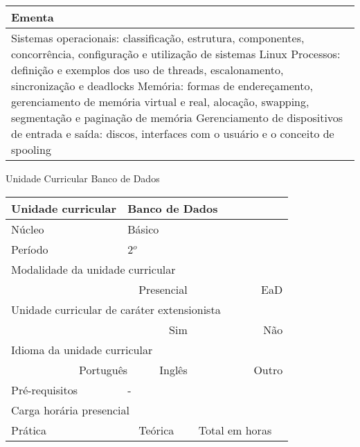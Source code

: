 \begin{quadro}[ht!]
\begin{tabular}{|p{3cm} p{2cm} p{3cm} p{2cm} p{3cm} p{2cm}|}
\multicolumn{6}{|p{15cm}|}{\cellcolor{blue1} Ementa} \\\hline
\hline\multicolumn{6}{|p{15cm}|}{\scriptsize Sistemas operacionais: classificação, estrutura, componentes, concorrência, configuração e utilização de sistemas Linux Processos: definição e exemplos dos uso de threads, escalonamento, sincronização e deadlocks Memória: formas de endereçamento, gerenciamento de memória virtual e real, alocação, swapping, segmentação e paginação de memória Gerenciamento de dispositivos de entrada e saída: discos, interfaces com o usuário e o conceito de spooling}\\\hline
\hline
	\end{tabular}
\end{quadro}
\begin{quadro}[ht!]
  \centering\scriptsize
\caption{Unidade Curricular Banco de Dados}
\label{ unit_9 }
\begin{tabular}{|p{3cm} p{2cm} p{3cm} p{2cm} p{3cm} p{2cm}|}\hline
\multicolumn{1}{|p{3cm}|}{\cellcolor{blue1} Unidade curricular} & \multicolumn{5}{p{9cm}|}{ Banco de Dados }\\\hline
\multicolumn{1}{|p{3cm}|}{\cellcolor{blue1} Núcleo} & \multicolumn{5}{p{11.5cm}|}{ Básico }\\\hline
\multicolumn{1}{|p{3cm}|}{\cellcolor{blue1} Período} & \multicolumn{5}{p{9cm}|}{ 2$^o$ }\\\hline
\multicolumn{6}{|p{15cm}|}{\cellcolor{blue1} Modalidade da unidade curricular} \\\hline
\multicolumn{2}{|r}{		} &  \multicolumn{2}{r}{Presencial \XBox } & \multicolumn{2}{r|}{EaD \Square	} \\\hline
\multicolumn{6}{|p{15cm}|}{\cellcolor{blue1} Unidade curricular de caráter extensionista} \\\hline
\multicolumn{4}{|r}{			Sim \Square	} & \multicolumn{2}{r|}{	Não \XBox	}\\\hline
\multicolumn{6}{|p{15cm}|}{\cellcolor{blue1} Idioma da unidade curricular} \\ \hline
\multicolumn{2}{|r}{	Português \XBox	} &  \multicolumn{2}{r}{	Inglês \Square	} & \multicolumn{2}{r|}{	Outro \Square	} \\ \hline
\multicolumn{1}{|p{3cm}|}{\cellcolor{blue1} Pré-requisitos} & \multicolumn{5}{p{9cm}|}{ - }\\ \hline
\multicolumn{6}{|p{15cm}|}{\cellcolor{blue1} Carga horária presencial} \\ \hline
\multicolumn{1}{|p{3cm}|}{\raggedleft Prática} & \multicolumn{1}{p{1cm}|}{\centering	30	} &  \multicolumn{1}{p{3cm}|}{\raggedleft Teórica}  & \multicolumn{1}{p{1cm}|}{\centering 	30 } & \multicolumn{1}{p{3cm}|}{\raggedleft Total em horas} & \multicolumn{1}{p{1cm}|}{\raggedleft	60	} \\ \hline

\end{tabular}
\end{quadro}
